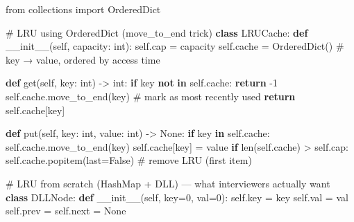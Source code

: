 \documentclass[11pt]{article}
\newenvironment{Shaded}{\begin{snugshade}}{\end{snugshade}}
\newcommand{\BuiltInTok}[1]{\textcolor[rgb]{0.50,0.55,0.55}{#1}}
\newcommand{\CommentTok}[1]{\textcolor[rgb]{0.48,0.49,0.49}{#1}}
\newcommand{\ControlFlowTok}[1]{\textcolor[rgb]{0.99,0.74,0.29}{\textbf{#1}}}
\newcommand{\DecValTok}[1]{\textcolor[rgb]{0.96,0.45,0.00}{#1}}
\newcommand{\FunctionTok}[1]{\textcolor[rgb]{0.56,0.27,0.68}{#1}}
\newcommand{\ImportTok}[1]{\textcolor[rgb]{0.15,0.68,0.38}{#1}}
\newcommand{\KeywordTok}[1]{\textcolor[rgb]{0.81,0.81,0.76}{\textbf{#1}}}
\newcommand{\NormalTok}[1]{\textcolor[rgb]{0.81,0.81,0.76}{#1}}
\newcommand{\OperatorTok}[1]{\textcolor[rgb]{0.81,0.81,0.76}{#1}}
\newcommand{\VariableTok}[1]{\textcolor[rgb]{0.15,0.68,0.68}{#1}}
\begin{document}
\begin{Shaded}
\begin{Highlighting}[]
\ImportTok{from}\NormalTok{ collections }\ImportTok{import}\NormalTok{ OrderedDict}

\CommentTok{\# LRU using OrderedDict (move\_to\_end trick)}
\KeywordTok{class}\NormalTok{ LRUCache:}
    \KeywordTok{def} \FunctionTok{\_\_init\_\_}\NormalTok{(}\VariableTok{self}\NormalTok{, capacity: }\BuiltInTok{int}\NormalTok{):}
        \VariableTok{self}\NormalTok{.cap }\OperatorTok{=}\NormalTok{ capacity}
        \VariableTok{self}\NormalTok{.cache }\OperatorTok{=}\NormalTok{ OrderedDict()  }\CommentTok{\# key → value, ordered by access time}

    \KeywordTok{def}\NormalTok{ get(}\VariableTok{self}\NormalTok{, key: }\BuiltInTok{int}\NormalTok{) }\OperatorTok{{-}\textgreater{}} \BuiltInTok{int}\NormalTok{:}
        \ControlFlowTok{if}\NormalTok{ key }\KeywordTok{not} \KeywordTok{in} \VariableTok{self}\NormalTok{.cache: }\ControlFlowTok{return} \OperatorTok{{-}}\DecValTok{1}
        \VariableTok{self}\NormalTok{.cache.move\_to\_end(key)  }\CommentTok{\# mark as most recently used}
        \ControlFlowTok{return} \VariableTok{self}\NormalTok{.cache[key]}

    \KeywordTok{def}\NormalTok{ put(}\VariableTok{self}\NormalTok{, key: }\BuiltInTok{int}\NormalTok{, value: }\BuiltInTok{int}\NormalTok{) }\OperatorTok{{-}\textgreater{}} \VariableTok{None}\NormalTok{:}
        \ControlFlowTok{if}\NormalTok{ key }\KeywordTok{in} \VariableTok{self}\NormalTok{.cache:}
            \VariableTok{self}\NormalTok{.cache.move\_to\_end(key)}
        \VariableTok{self}\NormalTok{.cache[key] }\OperatorTok{=}\NormalTok{ value}
        \ControlFlowTok{if} \BuiltInTok{len}\NormalTok{(}\VariableTok{self}\NormalTok{.cache) }\OperatorTok{\textgreater{}} \VariableTok{self}\NormalTok{.cap:}
            \VariableTok{self}\NormalTok{.cache.popitem(last}\OperatorTok{=}\VariableTok{False}\NormalTok{)  }\CommentTok{\# remove LRU (first item)}

\CommentTok{\# LRU from scratch (HashMap + DLL) — what interviewers actually want}
\KeywordTok{class}\NormalTok{ DLLNode:}
    \KeywordTok{def} \FunctionTok{\_\_init\_\_}\NormalTok{(}\VariableTok{self}\NormalTok{, key}\OperatorTok{=}\DecValTok{0}\NormalTok{, val}\OperatorTok{=}\DecValTok{0}\NormalTok{):}
        \VariableTok{self}\NormalTok{.key }\OperatorTok{=}\NormalTok{ key}
        \VariableTok{self}\NormalTok{.val }\OperatorTok{=}\NormalTok{ val}
        \VariableTok{self}\NormalTok{.prev }\OperatorTok{=} \VariableTok{self}\NormalTok{.}\BuiltInTok{next} \OperatorTok{=} \VariableTok{None}


\end{Highlighting}
\end{Shaded}
\end{document}
